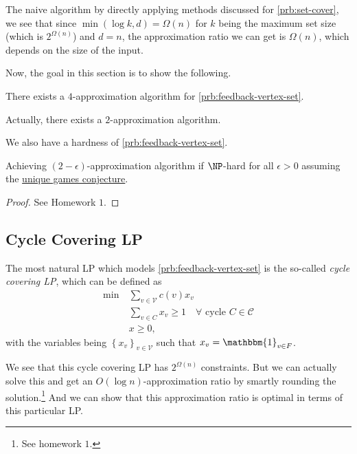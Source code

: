 \begin{note}
	The naive algorithm by directly applying methods discussed for \autoref{prb:set-cover}, we see that since \(\min (\log k, d) = \Omega (n)\) for \(k\) being the maximum set size (which is \(2^{\Omega (n)}\)) and \(d = n\), the approximation ratio we can get is \(\Omega (n)\), which depends on the size of the input.
\end{note}

Now, the goal in this section is to show the following.
\begin{theorem}\label{thm:feedback-vertex-set}
	There exists a \(4\)-approximation algorithm for \autoref{prb:feedback-vertex-set}.
\end{theorem}

\begin{remark}
	Actually, there exists a \(2\)-approximation algorithm.
\end{remark}

We also have a hardness of \autoref{prb:feedback-vertex-set}.
\begin{theorem}\label{thm:feed-back-vertex-set-hardness}
	Achieving \((2 - \epsilon )\)-approximation algorithm if \(\NP\)-hard for all \(\epsilon > 0\) assuming the \hyperref[conj:unique-game]{unique games conjecture}.
\end{theorem}
\begin{proof}
	See Homework \(1\).
\end{proof}

\subsection{Cycle Covering LP}\label{subsec:cycle-covering-LP}
The most natural LP which models \autoref{prb:feedback-vertex-set} is the so-called \emph{cycle covering LP}, which can be defined as
\[
	\begin{aligned}
		\min~ & \sum_{v\in \mathcal{V} } c(v) x_v                                                               \\
		      & \sum_{v\in C} x_v \geq 1                         \quad \forall \text{ cycle } C \in \mathcal{C} \\
		      & x \geq 0,
	\end{aligned}
\]
with the variables being \(\left\{ x_v \right\} _{v\in \mathcal{V} }\) such that \(x_{v} = \mathbbm{1}_{v\in F}\).

\begin{remark}
	We see that this cycle covering LP has \(2^{\Omega (n)}\) constraints. But we can actually solve this and get an \(O(\log n)\)-approximation ratio by smartly rounding the solution.\footnote{See homework \(1\).} And we can show that this approximation ratio is optimal in terms of this particular LP.
\end{remark}

